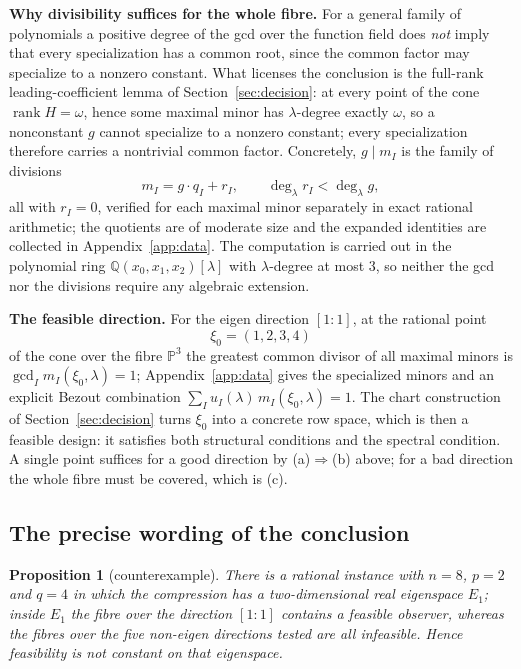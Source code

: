 \documentclass[journal]{IEEEtran}
\theoremstyle{plainn}
\newtheorem{prop}[thm]{Proposition}
\theoremstyle{remark}
\newcommand{\rank}{\operatorname{rank}}
\begin{document}
\textbf{Why divisibility suffices for the whole fibre.} For a general family of polynomials a positive
degree of the gcd over the function field does \emph{not} imply that every specialization has a common
root, since the common factor may specialize to a nonzero constant. What licenses the conclusion is the
full-rank leading-coefficient lemma of Section~\ref{sec:decision}: at every point of the cone
$\rank H=\omega$, hence some maximal minor has $\lambda$-degree exactly $\omega$, so a nonconstant $g$
cannot specialize to a nonzero constant; every specialization therefore carries a nontrivial common
factor. Concretely, $g\mid m_I$ is the family of divisions
\begin{equation}\label{sec6:eq:division}
m_I=g\cdot q_I+r_I,\qquad \deg_\lambda r_I<\deg_\lambda g,
\end{equation}
all with $r_I=0$, verified for each maximal minor separately in exact rational arithmetic; the
quotients are of moderate size and the expanded identities are collected in Appendix~\ref{app:data}.
The computation is carried out in the polynomial ring $\mathbb{Q}(x_0,x_1,x_2)[\lambda]$ with
$\lambda$-degree at most $3$, so neither the gcd nor the divisions require any algebraic extension.

\textbf{The feasible direction.} For the eigen direction $[1\!:\!1]$, at the rational point
\begin{equation}\label{sec6:eq:x0}
\xi_0=(1,2,3,4)
\end{equation}
of the cone over the fibre $\mathbb{P}^{3}$ the greatest common divisor of all maximal minors is
$\gcd_I m_I(\xi_0,\lambda)=1$; Appendix~\ref{app:data} gives the specialized minors and an explicit
Bezout combination $\sum_I u_I(\lambda)\,m_I(\xi_0,\lambda)=1$. The chart construction of
Section~\ref{sec:decision} turns $\xi_0$ into a concrete row space, which is then a feasible design: it
satisfies both structural conditions and the spectral condition. A single point suffices for a good
direction by (a)$\Rightarrow$(b) above; for a bad direction the whole fibre must be covered, which is
(c).

\subsection{The precise wording of the conclusion}\label{sec6:sub:conclusion}

\begin{prop}[counterexample]\label{sec6:prop:nonconstant}
There is a rational instance with $n=8$, $p=2$ and $q=4$ in which the compression has a
two-dimensional real eigenspace $E_1$; inside $E_1$ the fibre over the direction $[1\!:\!1]$ contains
a feasible observer, whereas the fibres over the five non-eigen directions tested are all infeasible.
Hence feasibility is not constant on that eigenspace.
\end{prop}
\end{document}
